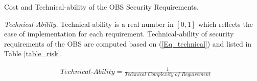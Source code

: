 \begin{table*}[t]
	\caption{Cost and Technical-ability of the OBS Security Requirements.}
	\label{table_risk}
	\centering
	
\end{table*}

\textit{Technical-Ability}. Technical-ability is a real number in $[0,1]$ which reflects the ease of implementation for each requirement. Technical-ability of security requirements of the OBS are computed based on (\ref{Eq_technical}) and listed in Table \ref{table_risk}.  

\begin{align}
\label{Eq_technical}
& Technical\text{-}Ability=\frac{1}{\textit{Technical Complexity of Requirement}}
\end{align}